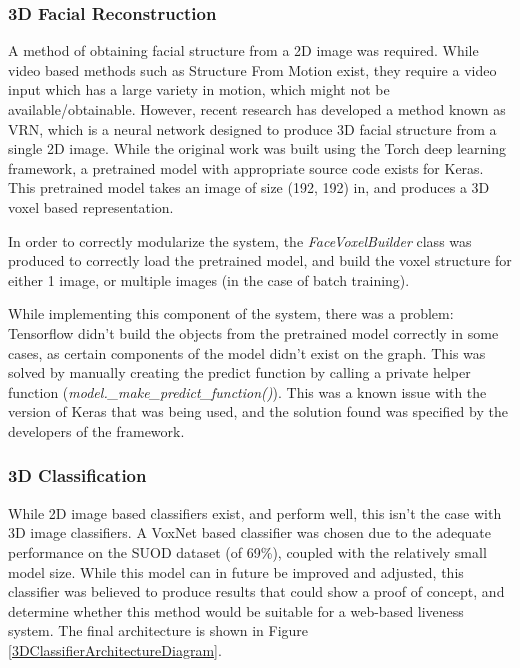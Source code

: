 \documentclass[10pt,a4paper]{article}
\begin{document}
        \subsubsection{3D Facial Reconstruction}
            A method of obtaining facial structure from a 2D image was required. While video based methods such as Structure From Motion exist, they require a video input which has a large variety in motion, which might not be available/obtainable.
            However, recent research has developed a method known as VRN, which is a neural network designed to produce 3D facial structure from a single 2D image. \cite{3DReconstructionMethod}
            While the original work was built using the Torch deep learning framework, a pretrained model with appropriate source code exists for Keras. \cite{VRNTorchToKeras} This pretrained model
            takes an image of size (192, 192) in, and produces a 3D voxel based representation. 

            In order to correctly modularize the system, the \emph{FaceVoxelBuilder} class was produced to correctly load the pretrained model, and build the voxel structure for either 1 image, or multiple images (in the case of batch training).

            While implementing this component of the system, there was a problem: Tensorflow didn't build the objects from the pretrained model correctly in some cases, as certain components of the model didn't exist on the graph. This was solved by manually creating the predict function by calling a private helper function (\emph{model.\_make\_predict\_function()}).
            This was a known issue with the version of Keras that was being used, and the solution found was specified by the developers of the framework. \cite{KerasVoxNetBug}

        \subsubsection{3D Classification}
            While 2D image based classifiers exist, and perform well, this isn't the case with 3D image classifiers. A VoxNet based classifier was chosen due to the adequate performance on the SUOD dataset (of 69\%),
            coupled with the relatively small model size. \cite{VoxNetModel} While this model can in future be improved and adjusted, this classifier was believed to produce results that could show a proof of concept,
            and determine whether this method would be suitable for a web-based liveness system. The final architecture is shown in Figure \ref{3DClassifierArchitectureDiagram}.
\end{document}
